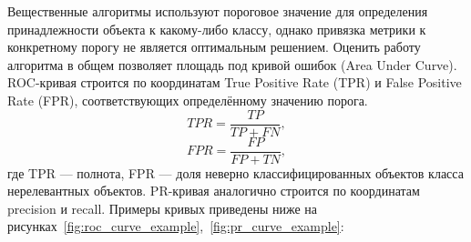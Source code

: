 Вещественные алгоритмы используют пороговое значение для определения принадлежности объекта к какому-либо классу, однако привязка метрики к конкретному порогу не является оптимальным решением.
Оценить работу алгоритма в общем позволяет площадь под кривой ошибок (Area Under Curve).
ROC-кривая строится по координатам True Positive Rate (TPR) и False Positive Rate (FPR), соответствующих определённому значению порога.
\begin{equation}\label{eq:tpr}
TPR = \frac{TP}{TP + FN},
\end{equation}
\begin{equation}\label{eq:fpr}
FPR = \frac{FP}{FP + TN},
\end{equation}
где TPR --- полнота, FPR --- доля неверно классифицированных объектов класса нерелевантных объектов.
PR-кривая аналогично строится по координатам precision и recall.
Примеры кривых приведены ниже на рисунках~\ref{fig:roc_curve_example},~\ref{fig:pr_curve_example}:
